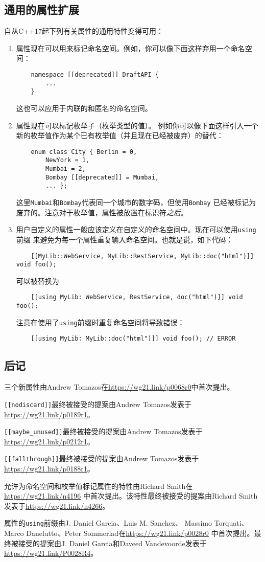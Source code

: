 \subsection{通用的属性扩展}
自从C++17起下列有关属性的通用特性变得可用：
\begin{enumerate}[leftmargin=*]
    \item 属性现在可以用来标记命名空间。例如，你可以像下面这样弃用一个命名空间：
    \begin{lstlisting}
    namespace [[deprecated]] DraftAPI {
        ...
    }
    \end{lstlisting}
    这也可以应用于内联的和匿名的命名空间。
    \item 属性现在可以标记枚举子（枚举类型的值）。
    例如你可以像下面这样引入一个新的枚举值作为某个已有枚举值（并且现在已经被废弃）的替代：
    \begin{lstlisting}
    enum class City { Berlin = 0,
        NewYork = 1,
        Mumbai = 2,
        Bombay [[deprecated]] = Mumbai,
        ... };
    \end{lstlisting}
    这里\texttt{Mumbai}和\texttt{Bombay}代表同一个城市的数字码，但使用\texttt{Bombay}
    已经被标记为废弃的。注意对于枚举值，属性被放置在标识符\emph{之后}。
    \item 用户自定义的属性一般应该定义在自定义的命名空间中。现在可以使用\texttt{using}前缀
    来避免为每一个属性重复输入命名空间。也就是说，如下代码：
    \begin{lstlisting}
    [[MyLib::WebService, MyLib::RestService, MyLib::doc("html")]] void foo();
    \end{lstlisting}
    可以被替换为
    \begin{lstlisting}
    [[using MyLib: WebService, RestService, doc("html")]] void foo();
    \end{lstlisting}
    注意在使用了\texttt{using}前缀时重复命名空间将导致错误：
    \begin{lstlisting}
    [[using MyLib: MyLib::doc("html")]] void foo(); // ERROR
    \end{lstlisting}
\end{enumerate}

\subsection{后记}
三个新属性由Andrew Tomazos在\url{https://wg21.link/p0068r0}中首次提出。

\texttt{[[nodiscard]]}最终被接受的提案由Andrew Tomazos发表于
\url{https://wg21.link/p0189r1}。

\texttt{[[maybe\_unused]]}最终被接受的提案由Andrew Tomazos发表于
\url{https://wg21.link/p0212r1}。

\texttt{[[fallthrough]]}最终被接受的提案由Andrew Tomazos发表于
\url{https://wg21.link/p0188r1}。

允许为命名空间和枚举值标记属性的特性由Richard Smith在\url{https://wg21.link/n4196}
中首次提出。该特性最终被接受的提案由Richard Smith发表于\url{https://wg21.link/n4266}。

属性的\texttt{using}前缀由J. Daniel Garcia、Luis M. Sanchez、
Massimo Torquati、Marco Danelutto、Peter Sommerlad在\url{https://wg21.link/p0028r0}
中首次提出。最终被接受的提案由J. Daniel Garcia和Daveed Vandevoorde发表于
\url{https://wg21.link/P0028R4}。